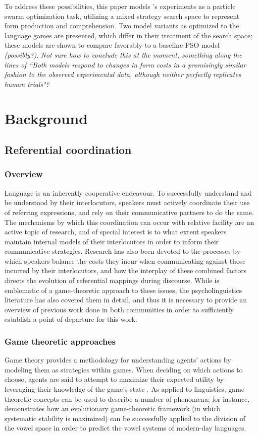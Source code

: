 \documentclass[12pt,a4paper]{article}
\begin{document}
To address these possibilities, this paper models \citeauthor{rohde2012}'s experiments as a particle swarm optimization task, utilizing a mixed strategy search space to represent form production and comprehension. Two model variants as optimized to the \citeauthor{rohde2012} language games are presented, which differ in their treatment of the search space; these models are shown to compare favorably to a baseline PSO model \textit{(possibly?)}. 
\textit{Not sure how to conclude this at the moment, something along the lines of ``Both models respond to changes in form costs in a promisingly similar fashion to the observed experimental data, although neither perfectly replicates human trials"?}


\section{Background}
\subsection{Referential coordination}
\subsubsection{Overview}
Language is an inherently cooperative endeavour. To successfully understand and be understood by their interlocutors, speakers must actively coordinate their use of referring expressions, and rely on their communicative partners to do the same. The mechanisms by which this coordination can occur with relative facility are an active topic of research, and of special interest is to what extent speakers maintain internal models of their interlocutors in order to inform their communicative strategies. Research has also been devoted to the processes by which speakers balance the costs they incur when communicating against those incurred by their interlocutors, and how the interplay of these combined factors directs the evolution of referential mappings during discourse. While \citeauthor{rohde2012} is emblematic of a game-theoretic approach to these issues, the psycholinguistics literature has also covered them in detail, and thus it is necessary to provide an overview of previous work done in both communities in order to sufficiently establish a point of departure for this work.

\subsubsection{Game theoretic approaches}
Game theory provides a methodology for understanding agents' actions by modeling them as strategies within games. When deciding on which actions to choose, agents are said to attempt to maximize their expected utility by leveraging their knowledge of the game's state \citep{benz2005}. As applied to linguistics, game theoretic concepts can be used to describe a number of phenomena; for instance, \cite{jaeger2008} demonstrates how an evolutionary game-theoretic framework (in which systematic stability is maximized) can be successfully applied to the division of the vowel space in order to predict the vowel systems of modern-day languages.
\end{document}
